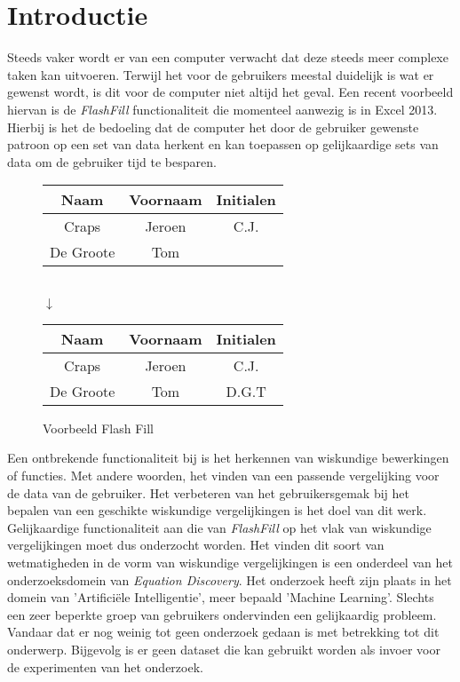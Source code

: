 \documentclass[Main.tex]{subfiles}
\begin{document}
\section{Introductie}
Steeds vaker wordt er van een computer verwacht dat deze steeds meer complexe taken kan uitvoeren. Terwijl het voor de gebruikers meestal duidelijk is wat er gewenst wordt, is dit voor de computer niet altijd het geval. Een recent voorbeeld hiervan is de \textit{FlashFill}\cite{flashFill} functionaliteit die momenteel aanwezig is in Excel 2013. Hierbij is het de bedoeling dat de computer het door de gebruiker gewenste patroon op een set van data herkent en kan toepassen op gelijkaardige sets van data om de gebruiker tijd te besparen.

\begin{figure}[!htb]
\centering
\begin{framed}
\begin{tabular}{| c | c | c |}
\hline
Naam & Voornaam & Initialen \\ \hline
Craps & Jeroen & C.J. \\ \hline
De Groote & Tom &  \\ \hline
\end{tabular} \\
$\downarrow$ \\
\begin{tabular}{| c | c | c |}
\hline
Naam & Voornaam & Initialen \\ \hline
Craps & Jeroen & C.J. \\ \hline
De Groote & Tom &  D.G.T \\ \hline
\end{tabular}
\end{framed}
\caption{Voorbeeld Flash Fill}
\label{fig:flashfill}
\end{figure}

\par Een ontbrekende functionaliteit bij  is het herkennen van wiskundige bewerkingen of functies. Met andere woorden, het vinden van een passende vergelijking voor de data van de gebruiker. Het verbeteren van het gebruikersgemak bij het bepalen van een geschikte wiskundige vergelijkingen is het doel van dit werk. Gelijkaardige functionaliteit aan die van \textit{FlashFill} op het vlak van wiskundige vergelijkingen moet dus onderzocht worden. Het vinden dit soort van wetmatigheden in de vorm van wiskundige vergelijkingen is een onderdeel van het onderzoeksdomein van \textit{Equation Discovery}\cite{equationDisc}. Het onderzoek heeft zijn plaats in het domein van 'Artifici\"ele Intelligentie', meer bepaald 'Machine Learning'. Slechts een zeer beperkte groep van gebruikers ondervinden een gelijkaardig probleem. Vandaar dat er nog weinig tot geen onderzoek gedaan is met betrekking tot dit onderwerp. Bijgevolg is er geen dataset die kan gebruikt worden als invoer voor de experimenten van het onderzoek.  \par
\end{document}
